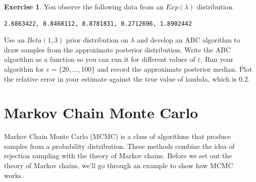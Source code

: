 \documentclass[
]{book}
\theoremstyle{definition}
\theoremstyle{definition}
\theoremstyle{definition}
\newtheorem{exercise}{Exercise}[chapter]
\theoremstyle{definition}
\theoremstyle{remark}
\begin{document}
\begin{exercise}
You observe the following data from an \(Exp(\lambda)\) distribution.

\begin{verbatim}
2.6863422, 8.8468112, 8.8781831, 0.2712696, 1.8902442
\end{verbatim}

Use an \(Beta(1, 3)\) prior distribution on \(\lambda\) and develop an ABC algorithm to draw samples from the approximate posterior distribution. Write the ABC algorithm as a function so you can run it for different values of \(\varepsilon\). Run your algorithm for \(\varepsilon = \{20, \ldots, 100\}\) and record the approximate posterior median. Plot the relative error in your estimate against the true value of lambda, which is 0.2.
\end{exercise}

\hypertarget{markov-chain-monte-carlo}{%
\chapter{Markov Chain Monte Carlo}\label{markov-chain-monte-carlo}}

Markov Chain Monte Carlo (MCMC) is a class of algorithms that produce samples from a probability distribution. These methods combine the idea of rejection sampling with the theory of Markov chains. Before we set out the theory of Markov chains, we'll go through an example to show how MCMC works.
\end{document}
